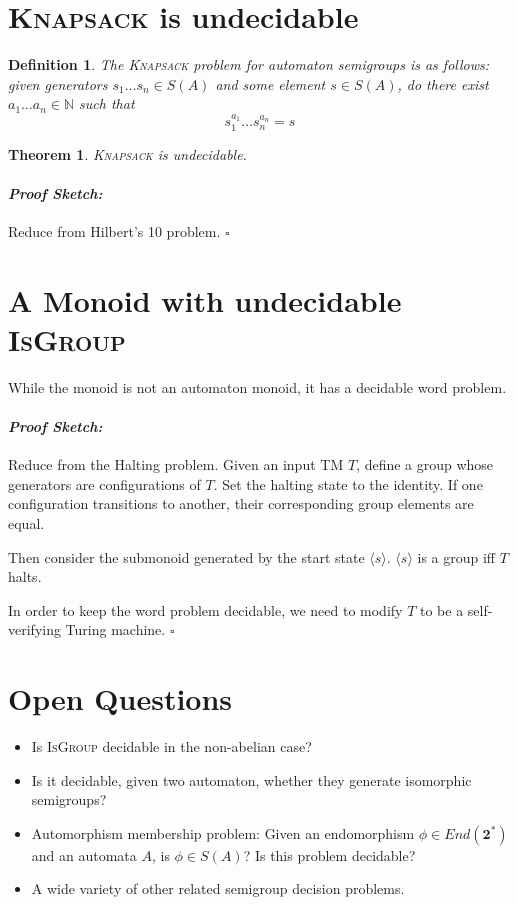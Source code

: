 \documentclass[a0,16pt]{a0poster}
\theoremstyle{pleasant}
\newtheorem{theorem}{Theorem}
\newtheorem{definition}{Definition}
\newenvironment{proofsketch}{\paragraph{\Large \normalfont \textit{Proof Sketch:}}}{\hfill$\square$}
\newcommand{\0}{\underline{0}}
\newcommand{\1}{\underline{1}}
\newcommand{\2}{\underline{2}}
\newcommand{\N}{\mathbb{N}}
\begin{document}
\begin{multicols}{3}
\section*{\textsc{Knapsack} is undecidable}

\begin{definition}
The \textsc{Knapsack} problem for automaton semigroups is as follows: given generators $s_1\ldots s_n \in S(A)$ and some element $s \in S(A)$, do there exist $a_1\ldots a_n \in \N$ such that \[s_1^{a_1}\ldots s_n^{a_n} = s \]
\end{definition}

\begin{theorem}
\textsc{Knapsack} is undecidable.
\end{theorem}

\begin{proofsketch}
Reduce from Hilbert's 10 problem.
\end{proofsketch}

\section*{A Monoid with undecidable \textsc{IsGroup}}

While the monoid is not an automaton monoid, it has a decidable word problem.

\begin{proofsketch}
Reduce from the Halting problem. Given an input TM $T$, define a group whose generators are configurations of $T$. Set the halting state to the identity. If one configuration transitions to another, their corresponding group elements are equal.

Then consider the submonoid generated by the start state $\langle s \rangle$. $\langle s \rangle$ is a group iff $T$ halts.

In order to keep the word problem decidable, we need to modify $T$ to be a self-verifying Turing machine.
\end{proofsketch}

\section*{Open Questions}

\begin{itemize}
\item Is \textsc{IsGroup} decidable in the non-abelian case?
\item Is it decidable, given two automaton, whether they generate isomorphic semigroups? 
\item Automorphism membership problem: Given an endomorphism $\phi \in End(\textbf{2}^*)$ and an automata $A$, is $\phi \in S(A)$? Is this problem decidable?
\item A wide variety of other related semigroup decision problems.
\end{itemize}


\end{multicols}
\end{document}
